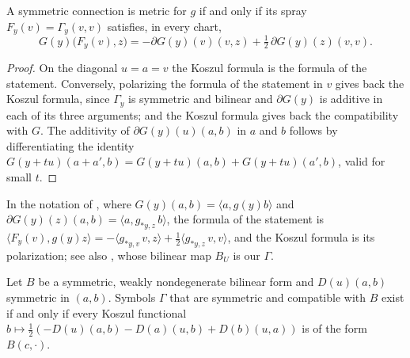 \begin{theorem}
  \label{thm:mt-metric-spray}
  \leanok
  A symmetric connection is metric for $g$ if and only if its spray $F_y(v) = \Gamma_y(v, v)$
  satisfies, in every chart,
  \[
    G(y)\bigl(F_y(v), z\bigr) = -\partial G(y)(v)(v, z) + \tfrac12\, \partial G(y)(z)(v, v).
  \]
\end{theorem}

\begin{proof}
  \leanok
  On the diagonal $u = a = v$ the Koszul formula is the formula of the statement. Conversely,
  polarizing the formula of the statement in $v$ gives back the Koszul formula, since $\Gamma_y$ is
  symmetric and bilinear and $\partial G(y)$ is additive in each of its three arguments; and the
  Koszul formula gives back the compatibility with $G$. The additivity of $\partial G(y)(u)(a, b)$
  in $a$ and $b$ follows by differentiating the identity
  $G(y + tu)(a + a', b) = G(y + tu)(a, b) + G(y + tu)(a', b)$, valid for small $t$.
\end{proof}

In the notation of \cite[Teorema 10.1.1]{Lar26}, where $G(y)(a, b) = \langle a, g(y) b\rangle$ and
$\partial G(y)(z)(a, b) = \langle a, g_{*y,z}\, b\rangle$, the formula of the statement is
$\langle F_y(v), g(y) z\rangle = -\langle g_{*y,v}\, v, z\rangle + \frac12 \langle g_{*y,z}\, v,
v\rangle$, and the Koszul formula is its polarization; see also \cite[Ch.~VIII, Theorem 4.2, MS 1]{Lan99}, whose bilinear map $B_U$ is our $\Gamma$.

\begin{proposition}
  \label{prop:mt-lc-existence}
  \leanok
  Let $B$ be a symmetric, weakly nondegenerate bilinear form and $D(u)(a, b)$ symmetric in $(a, b)$.
  Symbols $\Gamma$ that are symmetric and compatible with $B$ exist if and only if every Koszul
  functional $b \mapsto \frac12(-D(u)(a, b) - D(a)(u, b) + D(b)(u, a))$ is of the form $B(c, \cdot)$.
\end{proposition}

